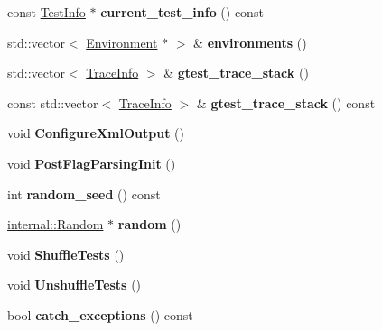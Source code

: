 \begin{DoxyCompactItemize}
const \mbox{\hyperlink{classtesting_1_1TestInfo}{Test\+Info}} $\ast$ {\bfseries current\+\_\+test\+\_\+info} () const
\item 
\mbox{\label{classtesting_1_1internal_1_1UnitTestImpl_aa1489e6a2378d64d68bc01963ea5db4a}} 
std\+::vector$<$ \mbox{\hyperlink{classtesting_1_1Environment}{Environment}} $\ast$ $>$ \& {\bfseries environments} ()
\item 
\mbox{\label{classtesting_1_1internal_1_1UnitTestImpl_af8c7c0a0c954e36d83e6e4690d3fb938}} 
std\+::vector$<$ \mbox{\hyperlink{structtesting_1_1internal_1_1TraceInfo}{Trace\+Info}} $>$ \& {\bfseries gtest\+\_\+trace\+\_\+stack} ()
\item 
\mbox{\label{classtesting_1_1internal_1_1UnitTestImpl_ad82fed50f13f13f11867af9dad4a2cf6}} 
const std\+::vector$<$ \mbox{\hyperlink{structtesting_1_1internal_1_1TraceInfo}{Trace\+Info}} $>$ \& {\bfseries gtest\+\_\+trace\+\_\+stack} () const
\item 
\mbox{\label{classtesting_1_1internal_1_1UnitTestImpl_a21cd7b2928de03a55b5252f29dd5ae6d}} 
void {\bfseries Configure\+Xml\+Output} ()
\item 
\mbox{\label{classtesting_1_1internal_1_1UnitTestImpl_a772894193104b1b2516f16e6ff813168}} 
void {\bfseries Post\+Flag\+Parsing\+Init} ()
\item 
\mbox{\label{classtesting_1_1internal_1_1UnitTestImpl_a625b9fb6d17b008c44fc902255e6343c}} 
int {\bfseries random\+\_\+seed} () const
\item 
\mbox{\label{classtesting_1_1internal_1_1UnitTestImpl_ab3b45b5eb4d583219a3602011ea44347}} 
\mbox{\hyperlink{classtesting_1_1internal_1_1Random}{internal\+::\+Random}} $\ast$ {\bfseries random} ()
\item 
\mbox{\label{classtesting_1_1internal_1_1UnitTestImpl_aaaa38e6a4372e6bb9bbe3143a3a32b65}} 
void {\bfseries Shuffle\+Tests} ()
\item 
\mbox{\label{classtesting_1_1internal_1_1UnitTestImpl_a1ee7db3bf8284dd9dce4dc857564bce3}} 
void {\bfseries Unshuffle\+Tests} ()
\item 
\mbox{\label{classtesting_1_1internal_1_1UnitTestImpl_aa311b980783a9cfb547831f7b19e3f3a}} 
bool {\bfseries catch\+\_\+exceptions} () const
\end{DoxyCompactItemize}
